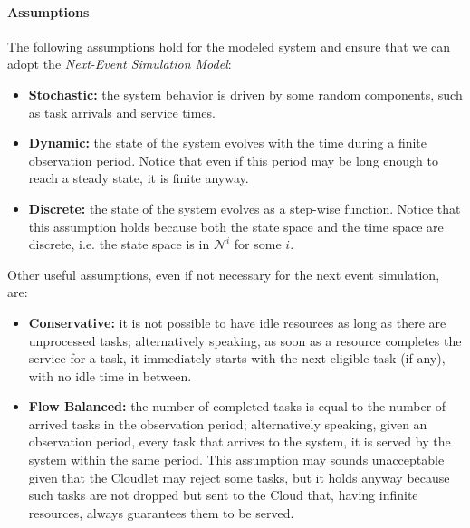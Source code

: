 \paragraph{Assumptions}
The following assumptions hold for the modeled system and ensure that we can adopt the \textit{Next-Event Simulation Model}:

\begin{itemize}
	\item \textbf{Stochastic:} the system behavior is driven by some random components, such as task arrivals and service times.
	
	\item \textbf{Dynamic:} the state of the system evolves with the time during a finite observation period. Notice that even if this period may be long enough to reach a steady state, it is finite anyway.
	
	\item \textbf{Discrete:} the state of the system evolves as a step-wise function. Notice that this assumption holds because both the state space and the time space are discrete, i.e. the state space is in $\mathcal{N}^{i}$ for some $i$.
\end{itemize}

Other useful assumptions, even if not necessary for the next event simulation, are:

\begin{itemize}
	\item \textbf{Conservative:} it is not possible to have idle resources as long as there are unprocessed tasks; alternatively speaking, as soon as a resource completes the service for a task, it immediately starts with the next eligible task (if any), with no idle time in between.
	
	\item \textbf{Flow Balanced:} the number of completed tasks is equal to the number of  arrived tasks in the observation period; alternatively speaking, given an observation period, every task that arrives to the system, it is served by the system within the same period. This assumption may sounds unacceptable given that the Cloudlet may reject some tasks, but it holds anyway because such tasks are not dropped but sent to the Cloud that, having infinite resources, always guarantees them to be served.
\end{itemize}